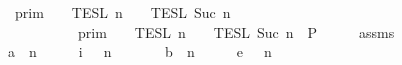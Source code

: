 \begin{isabellebody}
\ \ \ {\isacartoucheopen}{\isasymlbrakk}{\isasymlbrakk}\ {\isasymGamma}\ {\isasymrbrakk}{\isasymrbrakk}\isactrlsub p\isactrlsub r\isactrlsub i\isactrlsub m\ {\isasyminter}\ {\isasymlbrakk}{\isasymlbrakk}\ {\isasymPsi}\ {\isasymrbrakk}{\isasymrbrakk}\isactrlsub T\isactrlsub E\isactrlsub S\isactrlsub L\isactrlbsup {\isasymge}\ n\isactrlesup \ {\isasyminter}\ {\isasymlbrakk}{\isasymlbrakk}\ {\isasymPhi}\ {\isasymrbrakk}{\isasymrbrakk}\isactrlsub T\isactrlsub E\isactrlsub S\isactrlsub L\isactrlbsup {\isasymge}\ Suc\ n\isactrlesup \isanewline
\ \ \ \ \ \ \ \ \ \ {\isasymsupseteq}\ \ {\isasymlbrakk}{\isasymlbrakk}\ {\isasymGamma}\ {\isasymrbrakk}{\isasymrbrakk}\isactrlsub p\isactrlsub r\isactrlsub i\isactrlsub m\ {\isasyminter}\ {\isasymlbrakk}{\isasymlbrakk}\ {\isasymPsi}\ {\isasymrbrakk}{\isasymrbrakk}\isactrlsub T\isactrlsub E\isactrlsub S\isactrlsub L\isactrlbsup {\isasymge}\ n\isactrlesup \ {\isasyminter}\ {\isasymlbrakk}{\isasymlbrakk}\ {\isasymPhi}\ {\isasymrbrakk}{\isasymrbrakk}\isactrlsub T\isactrlsub E\isactrlsub S\isactrlsub L\isactrlbsup {\isasymge}\ Suc\ n\isactrlesup {\isacartoucheclose}\ {\isacharparenleft}\ {\isacharquery}P{\isacharparenright}\isanewline
%
\isadelimproof
%
\endisadelimproof
%
\isatagproof
{}\isamarkupfalse%
\ {\isacharminus}\isanewline
\ \ \isamarkupfalse%
\ assms\ \isamarkupfalse%
\isanewline
\ \ \ \ {\isacharparenleft}a{\isacharparenright}\ {\isacartoucheopen}{\isacharparenleft}{\isasymGamma}\ n\ {\isasymturnstile}\ {\isasymPsi}\ {\isasymtriangleright}\ {\isasymPhi}\ \ {\isasymhookrightarrow}\isactrlsub i\ \ {\isacharparenleft}{\isasymGamma}\ n\ {\isasymturnstile}\ {\isasymPsi}\ {\isasymtriangleright}\ {\isasymPhi}\isanewline
\ \ {\isacharbar}\ {\isacharparenleft}b{\isacharparenright}\ {\isacartoucheopen}{\isacharparenleft}{\isasymGamma}\ n\ {\isasymturnstile}\ {\isasymPsi}\ {\isasymtriangleright}\ {\isasymPhi}\ \ {\isasymhookrightarrow}\isactrlsub e\ \ {\isacharparenleft}{\isasymGamma}\ n\ {\isasymturnstile}\ {\isasymPsi}\ {\isasymtriangleright}\ {\isasymPhi}\isanewline

\end{isabellebody}
